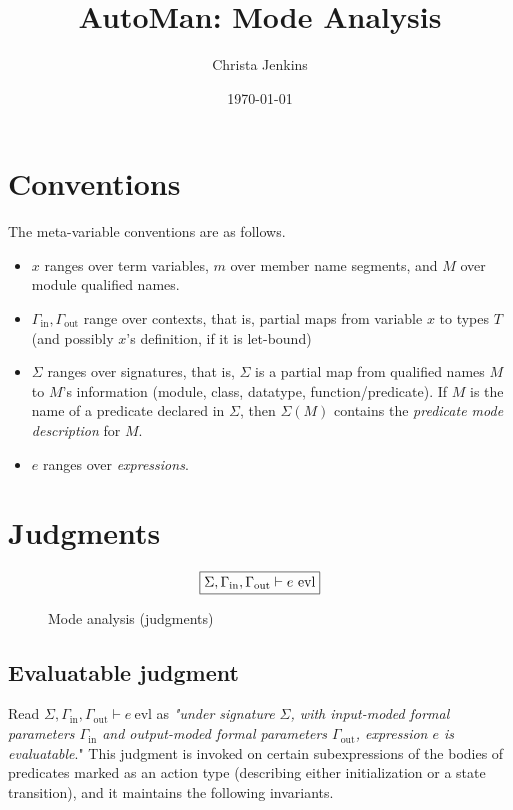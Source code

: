 \documentclass[11pt]{article}
\author{Christa Jenkins}
\date{\today}
\title{AutoMan: Mode Analysis}
\begin{document}
\maketitle

\section{Conventions}
\label{sec:org97aecb2}

The meta-variable conventions are as follows.
\begin{itemize}
\item \(x\) ranges over term variables, \(m\) over member name segments, and \(M\)
over module qualified names.
\item \(\Gamma_{\text{in}}, \Gamma_{\text{out}}\) range over contexts, that is,
partial maps from variable \(x\) to types \(T\) (and possibly \(x\)'s
definition, if it is let-bound)
\item \(\Sigma\) ranges over signatures, that is, \(\Sigma\) is a partial map from
qualified names \(M\) to \(M\)'s information (module, class, datatype,
function/predicate). If \(M\) is the name of a predicate declared in
\(\Sigma\), then \(\Sigma(M)\) contains the \emph{predicate mode description} for \(M\).
\item \(e\) ranges over \emph{expressions}.
\end{itemize}

\section{Judgments}
\label{sec:org1599a4b}

\begin{figure}
  \[
    \fbox{\(\Sigma, \Gamma_{\text{in}}, \Gamma_{\text{out}} \vdash e\ \text{evl}\)}
  \]
  \label{fig:judgment-listing}
  \caption{Mode analysis (judgments)}
\end{figure}

\subsection{Evaluatable judgment}
\label{sec:org817e32c}

Read \(\Sigma, \Gamma_{\text{in}}, \Gamma_{\text{out}} \vdash e\ \text{evl}\) as
\emph{"under signature \(\Sigma\), with input-moded formal parameters
\(\Gamma_{\text{in}}\) and output-moded formal parameters
\(\Gamma_{\text{out}}\), expression \(e\) is evaluatable}." This judgment is
invoked on certain subexpressions of the bodies of predicates marked as an
action type (describing either initialization or a state transition), and it
maintains the following invariants.
\end{document}
